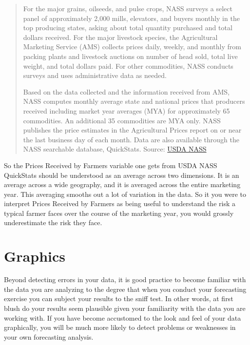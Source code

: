 \documentclass[]{book}
\theoremstyle{definition}
\theoremstyle{definition}
\theoremstyle{remark}
\begin{document}
\begin{quote}
For the major grains, oilseeds, and pulse crops, NASS surveys a select
panel of approximately 2,000 mills, elevators, and buyers monthly in the
top producing states, asking about total quantity purchased and total
dollars received. For the major livestock species, the Agricultural
Marketing Service (AMS) collects prices daily, weekly, and monthly from
packing plants and livestock auctions on number of head sold, total live
weight, and total dollars paid. For other commodities, NASS conducts
surveys and uses administrative data as needed.

Based on the data collected and the information received from AMS, NASS
computes monthly average state and national prices that producers
received including market year averages (MYA) for approximately 65
commodities. An additional 35 commodities are MYA only. NASS publishes
the price estimates in the Agricultural Prices report on or near the
last business day of each month. Data are also available through the
NASS searchable database, QuickStats. Source:
\href{http://www.nass.usda.gov/Surveys/Guide_to_NASS_Surveys/Prices_Received_and_Prices_Received_Indexes/index.asp}{USDA
NASS}
\end{quote}

So the Prices Received by Farmers variable one gets from USDA NASS
QuickStats should be understood as an average across two dimensions. It
is an average across a wide geography, and it is averaged across the
entire marketing year. This averaging smooths out a lot of variation in
the data. So it you were to interpret Prices Received by Farmers as
being useful to understand the risk a typical farmer faces over the
course of the marketing year, you would grossly underestimate the risk
they face.

\section{Graphics}\label{graphics}

Beyond detecting errors in your data, it is good practice to become
familiar with the data you are analyzing to the degree that when you
conduct your forecasting exercise you can subject your results to the
sniff test. In other words, at first blush do your results seem
plausible given your familiarity with the data you are working with. If
you have become accustomed to the look and feel of your data
graphically, you will be much more likely to detect problems or
weaknesses in your own forecasting analysis.
\end{document}
